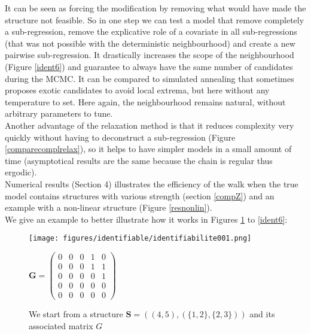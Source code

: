 \documentclass[12pt,a4paper]{report}
\begin{document}
	It can be seen as forcing the modification by removing what would have made the structure not feasible. So in one step we can test a model that remove completely a sub-regression, remove the explicative role of a covariate in all sub-regressions (that was not possible with the deterministic neighbourhood) and create a new pairwise sub-regression. It drastically increases the scope of the neighbourhood (Figure \ref{ident6}) and guarantee to always have the same number of candidates during the MCMC. It can be compared to simulated annealing that sometimes proposes exotic candidates to avoid local extrema, but here without any temperature to set. Here again, the neighbourhood remains natural, without arbitrary parameters to tune. \\
	
	Another advantage of the relaxation method is that it reduces complexity very quickly without having to deconstruct a sub-regression (Figure \ref{comparecomplrelax}), so it helps to have simpler models in a small amount of time (asymptotical results are the same because the chain is regular thus ergodic).\\
			
Numerical results (Section 4) illustrates the efficiency of the walk when the true model contains structures with various strength (section \ref{compZ}) and an example with a non-linear structure (Figure \ref{resnonlin}). \\

We give an example to better illustrate how it works in Figures \ref{ident1} to \ref{ident6}:
\begin{figure}
	\begin{minipage}[l]{.45\linewidth}
\texttt{[image: figures/identifiable/identifiabilite001.png]} 
	\end{minipage}
	\begin{minipage}[c]{.45\linewidth}
		$\boldsymbol{G}=\left( \begin{array}{ccccc}
		0 & 0 & 0 & 1 & 0 \\ 
		0 & 0 & 0 & 1 & 1 \\ 
		0 & 0 & 0 & 0 & 1 \\ 
		0 & 0 & 0 & 0 & 0 \\ 
		0 & 0 & 0 & 0 & 0
		\end{array} \right)$
	\end{minipage}
	\caption{We start from a structure $\boldsymbol{S}=((4,5),(\{1,2\},\{2,3\}))$ and its associated matrix $G$}\label{ident1}
\end{figure}
		
\end{document}
